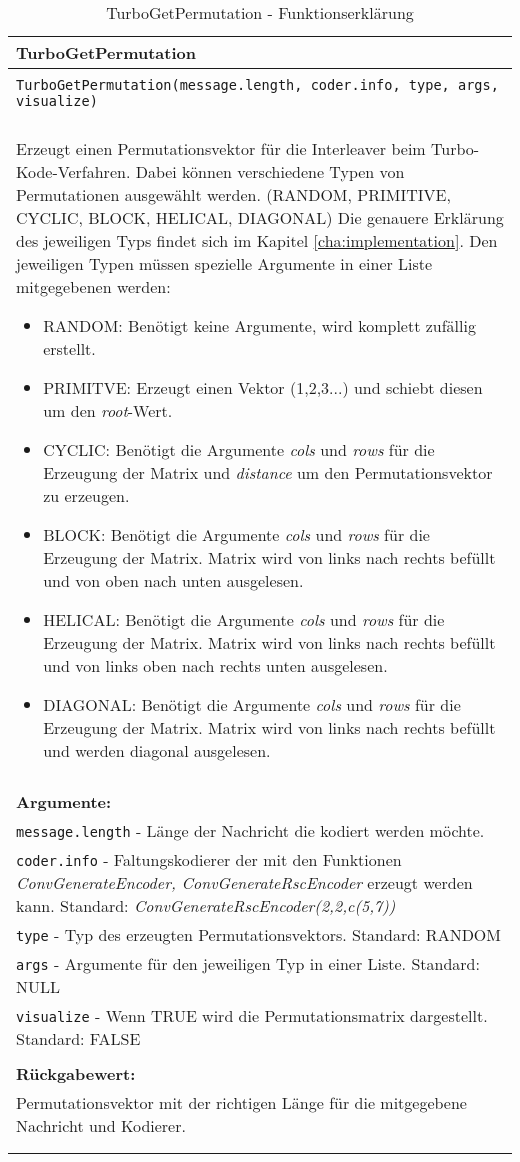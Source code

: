 \begin{longtable}{|p{\textwidth}|}
\hline
\rowcolor{lightblue}TurboGetPermutation\\
\hline
\\
\texttt{TurboGetPermutation(message.length, coder.info, type, args, visualize)}\\
\\
Erzeugt einen Permutationsvektor für die Interleaver beim Turbo-Kode-Verfahren. Dabei können verschiedene Typen von Permutationen ausgewählt werden. (RANDOM, PRIMITIVE, CYCLIC, BLOCK, HELICAL, DIAGONAL) Die genauere Erklärung des jeweiligen Typs findet sich im Kapitel \ref{cha:implementation}. Den jeweiligen Typen müssen spezielle Argumente in einer Liste mitgegebenen werden:
\begin{itemize}
\item RANDOM: Benötigt keine Argumente, wird komplett zufällig erstellt.
\item PRIMITVE: Erzeugt einen Vektor (1,2,3...) und schiebt diesen um den \emph{root}-Wert.
\item CYCLIC: Benötigt die Argumente \emph{cols} und \emph{rows} für die Erzeugung der Matrix und \emph{distance} um den Permutationsvektor zu erzeugen.
\item BLOCK: Benötigt die Argumente \emph{cols} und \emph{rows} für die Erzeugung der Matrix. Matrix wird von links nach rechts befüllt und von oben nach unten ausgelesen.
\item HELICAL: Benötigt die Argumente \emph{cols} und \emph{rows} für die Erzeugung der Matrix. Matrix wird von links nach rechts befüllt und von links oben nach rechts unten ausgelesen.
\item DIAGONAL: Benötigt die Argumente \emph{cols} und \emph{rows} für die Erzeugung der Matrix. Matrix wird von links nach rechts befüllt und werden diagonal ausgelesen.
\end{itemize} \\
\\
\textbf{Argumente:}\\
\texttt{message.length} - Länge der Nachricht die kodiert werden möchte.\\
\texttt{coder.info} - Faltungskodierer der mit den Funktionen \emph{ConvGenerateEncoder, ConvGenerateRscEncoder} erzeugt werden kann. Standard: \emph{ConvGenerateRscEncoder(2,2,c(5,7))}\\
\texttt{type} - Typ des erzeugten Permutationsvektors. Standard: RANDOM\\
\texttt{args} - Argumente für den jeweiligen Typ in einer Liste. Standard: NULL\\
\texttt{visualize} - Wenn TRUE wird die Permutationsmatrix dargestellt. Standard: FALSE\\
\\
\textbf{Rückgabewert:}\\
Permutationsvektor mit der richtigen Länge für die mitgegebene Nachricht und Kodierer.\\
\\
\hline
\caption{TurboGetPermutation - Funktionserklärung}
\end{longtable}